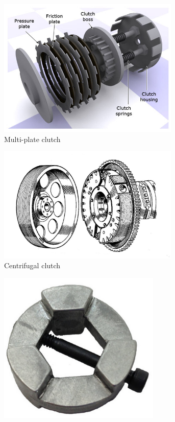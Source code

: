 \documentclass[10pt,letterpaper]{book}
\begin{document}
\begin{figure}[H]
	\begin{subfigure}[b]{.32\linewidth}
		\includegraphics[width=0.95\textwidth]{imgs/plate_clutch.jpeg}
		\caption{Multi-plate clutch}
	\end{subfigure}\begin{subfigure}[b]{.32\linewidth}
		\includegraphics[width=0.95\textwidth]{imgs/centrif_clutch.jpeg}
		\caption{Centrifugal clutch}
	\end{subfigure}\begin{subfigure}[b]{.32\linewidth}
		\includegraphics[width=0.85\textwidth]{imgs/shifting_dog.png}

\end{subfigure}
\end{figure}
\end{document}

